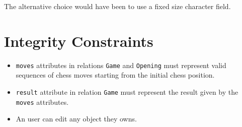 \documentclass{article}
\begin{document}
The alternative choice would have been to use a fixed size character field.



\section{Integrity Constraints}
\begin{itemize}
\item \verb|moves| attributes in relations \verb|Game| and \verb|Opening| must represent
valid sequences of chess moves starting from the initial chess position.

\item \verb|result| attribute in relation \verb|Game| must represent the result given by the
\verb|moves| attributes.

\item An user can edit any object they owns.
\end{itemize}
\end{document}
